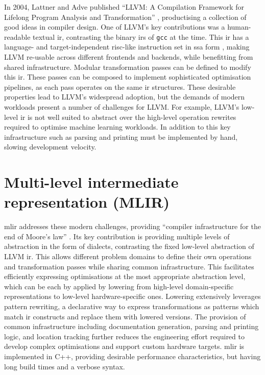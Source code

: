 In 2004, Lattner and Adve published ``LLVM: A Compilation Framework for
Lifelong Program Analysis and Transformation'' \cite{lattnerLLVMCompilationFramework2004}, productising a collection of good ideas in compiler design.
One of LLVM's key contributions was a human-readable textual \ac{ir}, contrasting the binary \ac{ir}s of \texttt{gcc} at the time. This \ac{ir} has a language- and target-independent \ac{risc}-like instruction set in \ac{ssa} form \cite{cytronEfficientlyComputingStatic1991}, making LLVM re-usable across different frontends and backends, while benefitting from shared infrastructure. Modular transformation passes can be defined to modify this \ac{ir}. These passes can be composed to implement sophisticated optimisation pipelines, as each pass operates on the same \ac{ir} structures.
These desirable properties lead to LLVM's widespread adoption, but the demands of modern workloads present a number of challenges for LLVM.
For example, LLVM's low-level \ac{ir} is not well suited to abstract over the high-level operation rewrites required to optimise machine learning workloads. In addition to this key infrastructure such as parsing and printing must be implemented by hand, slowing development velocity.

\section{Multi-level intermediate representation (MLIR)}
\label{sec:mlir}

\acf{mlir} addresses these modern challenges, providing ``compiler infrastructure for the end of Moore's law'' \cite{lattnerMLIRScalingCompiler2021a}.
Its key contribution is providing multiple levels of abstraction in the form of dialects, contrasting the fixed low-level abstraction of LLVM \ac{ir}. This allows different problem domains to define their own operations and transformation passes while sharing common infrastructure. This facilitates efficiently expressing optimisations at the most appropriate abstraction level, which can be each by applied by lowering from high-level domain-specific representations to low-level hardware-specific ones. Lowering extensively leverages pattern rewriting, a declarative way to express transformations as patterns which match \ac{ir} constructs and replace them with lowered versions.
The provision of common infrastructure including documentation generation, parsing and printing logic, and location tracking further reduces the engineering effort required to develop complex optimisations and support custom hardware targets.
\ac{mlir} is implemented in C++, providing desirable performance characteristics, but having long build times and a verbose syntax.


